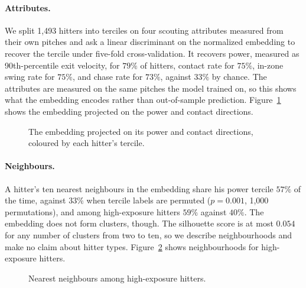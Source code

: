 \documentclass[11pt,letterpaper]{article}
\begin{document}
\paragraph{Attributes.} We split 1,493 hitters into terciles on four scouting attributes measured from their own pitches and ask a linear discriminant on the normalized embedding to recover the tercile under five-fold cross-validation. It recovers power, measured as 90th-percentile exit velocity, for $79\%$ of hitters, contact rate for $75\%$, in-zone swing rate for $75\%$, and chase rate for $73\%$, against $33\%$ by chance. The attributes are measured on the same pitches the model trained on, so this shows what the embedding encodes rather than out-of-sample prediction. Figure~\ref{fig:attr} shows the embedding projected on the power and contact directions.

\begin{figure}[t]
\centering
{}
\caption{The embedding projected on its power and contact directions, coloured by each hitter's tercile.}
\label{fig:attr}
\end{figure}

\paragraph{Neighbours.} A hitter's ten nearest neighbours in the embedding share his power tercile $57\%$ of the time, against $33\%$ when tercile labels are permuted ($p = 0.001$, 1,000 permutations), and among high-exposure hitters $59\%$ against $40\%$. The embedding does not form clusters, though. The silhouette score is at most $0.054$ for any number of clusters from two to ten, so we describe neighbourhoods and make no claim about hitter types. Figure~\ref{fig:neigh} shows neighbourhoods for high-exposure hitters.

\begin{figure}[t]
\centering
{}
\caption{Nearest neighbours among high-exposure hitters.}
\label{fig:neigh}
\end{figure}
\end{document}
